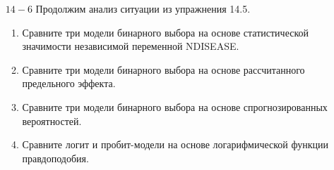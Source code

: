 \begin{enumerate}
\item [$14 - 6$] Продолжим анализ ситуации из упражнения 14.5.
\begin{enumerate}
\item  Сравните три модели бинарного выбора на основе статистической значимости независимой переменной NDISEASE.
\item  Сравните три модели бинарного выбора на основе рассчитанного предельного эффекта.
\item  Сравните три модели бинарного выбора на основе спрогнозированных вероятностей.
\item  Сравните логит и  пробит-модели на основе логарифмической функции правдоподобия.
\end{enumerate}
\end{enumerate}


